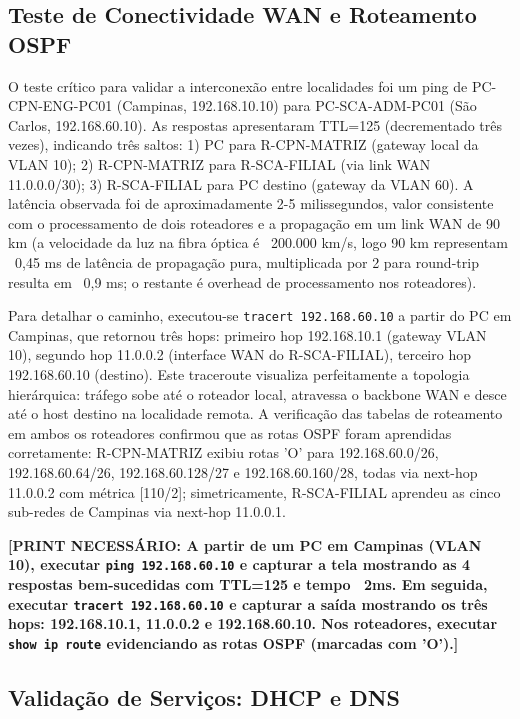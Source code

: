 \documentclass[12pt,a4paper]{article}
\begin{document}
\subsection{Teste de Conectividade WAN e Roteamento OSPF}

O teste crítico para validar a interconexão entre localidades foi um ping de PC-CPN-ENG-PC01 (Campinas, 192.168.10.10) para PC-SCA-ADM-PC01 (São Carlos, 192.168.60.10). As respostas apresentaram TTL=125 (decrementado três vezes), indicando três saltos: 1) PC para R-CPN-MATRIZ (gateway local da VLAN 10); 2) R-CPN-MATRIZ para R-SCA-FILIAL (via link WAN 11.0.0.0/30); 3) R-SCA-FILIAL para PC destino (gateway da VLAN 60). A latência observada foi de aproximadamente 2-5 milissegundos, valor consistente com o processamento de dois roteadores e a propagação em um link WAN de 90 km (a velocidade da luz na fibra óptica é ~200.000 km/s, logo 90 km representam ~0,45 ms de latência de propagação pura, multiplicada por 2 para round-trip resulta em ~0,9 ms; o restante é overhead de processamento nos roteadores).

Para detalhar o caminho, executou-se \texttt{tracert 192.168.60.10} a partir do PC em Campinas, que retornou três hops: primeiro hop 192.168.10.1 (gateway VLAN 10), segundo hop 11.0.0.2 (interface WAN do R-SCA-FILIAL), terceiro hop 192.168.60.10 (destino). Este traceroute visualiza perfeitamente a topologia hierárquica: tráfego sobe até o roteador local, atravessa o backbone WAN e desce até o host destino na localidade remota. A verificação das tabelas de roteamento em ambos os roteadores confirmou que as rotas OSPF foram aprendidas corretamente: R-CPN-MATRIZ exibiu rotas 'O' para 192.168.60.0/26, 192.168.60.64/26, 192.168.60.128/27 e 192.168.60.160/28, todas via next-hop 11.0.0.2 com métrica [110/2]; simetricamente, R-SCA-FILIAL aprendeu as cinco sub-redes de Campinas via next-hop 11.0.0.1.

\textbf{[PRINT NECESSÁRIO: A partir de um PC em Campinas (VLAN 10), executar \texttt{ping 192.168.60.10} e capturar a tela mostrando as 4 respostas bem-sucedidas com TTL=125 e tempo ~2ms. Em seguida, executar \texttt{tracert 192.168.60.10} e capturar a saída mostrando os três hops: 192.168.10.1, 11.0.0.2 e 192.168.60.10. Nos roteadores, executar \texttt{show ip route} evidenciando as rotas OSPF (marcadas com 'O').]}

\subsection{Validação de Serviços: DHCP e DNS}
\end{document}
